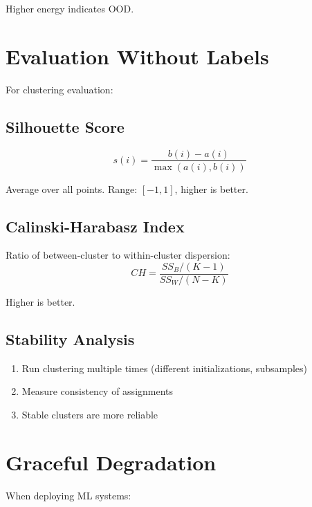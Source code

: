 Higher energy indicates OOD.


\section{Evaluation Without Labels}


For clustering evaluation:

\subsection{Silhouette Score}

\begin{equation}
    s(i) = \frac{b(i) - a(i)}{\max(a(i), b(i))}
\end{equation}

Average over all points. Range: $[-1, 1]$, higher is better.

\subsection{Calinski-Harabasz Index}

Ratio of between-cluster to within-cluster dispersion:
\begin{equation}
    CH = \frac{SS_B / (K-1)}{SS_W / (N-K)}
\end{equation}

Higher is better.

\subsection{Stability Analysis}

\begin{enumerate}
    \item Run clustering multiple times (different initializations, subsamples)
    \item Measure consistency of assignments
    \item Stable clusters are more reliable
\end{enumerate}


\section{Graceful Degradation}


When deploying ML systems:

